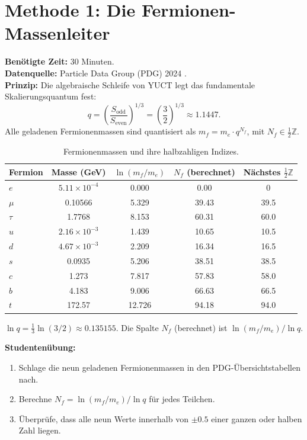 \documentclass[12pt,a4paper]{article}
\newcommand{\Sodd}{S_{\mathrm{odd}}}
\newcommand{\Seven}{S_{\mathrm{even}}}
\begin{document}
	\section{Methode 1: Die Fermionen-Massenleiter}
	\label{sec:massladder}
	
	\textbf{Benötigte Zeit:} 30 Minuten.\\
	\textbf{Datenquelle:} Particle Data Group (PDG) 2024 \cite{PDG2024}.\\
	\textbf{Prinzip:} Die algebraische Schleife von YUCT legt das fundamentale
	Skalierungsquantum fest:
	\[
	q = \left( \frac{\Sodd}{\Seven} \right)^{1/3} = \left( \frac{3}{2} \right)^{1/3} \approx 1.1447.
	\]
	Alle geladenen Fermionenmassen sind quantisiert als \(m_f = m_e \cdot q^{N_f}\),
	mit \(N_f \in \frac{1}{2}\mathbb{Z}\).
	
	\begin{table}[H]
		\centering
		\caption{Fermionenmassen und ihre halbzahligen Indizes.}
		\label{tab:fermions}
		\begin{tabular}{l c c c c}
			\toprule
			Fermion & Masse (GeV) & \(\ln(m_f/m_e)\) & \(N_f\) (berechnet) & Nächstes \(\frac{1}{2}\mathbb{Z}\) \\
			\midrule
			\(e\)   & \(5.11\times10^{-4}\) & 0.000  & 0.00  & 0 \\
			\(\mu\)  & 0.10566 & 5.329  & 39.43 & 39.5 \\
			\(\tau\) & 1.7768  & 8.153  & 60.31 & 60.0 \\
			\(u\)   & \(2.16\times10^{-3}\) & 1.439  & 10.65 & 10.5 \\
			\(d\)   & \(4.67\times10^{-3}\) & 2.209  & 16.34 & 16.5 \\
			\(s\)   & 0.0935  & 5.206  & 38.51 & 38.5 \\
			\(c\)   & 1.273   & 7.817  & 57.83 & 58.0 \\
			\(b\)   & 4.183   & 9.006  & 66.63 & 66.5 \\
			\(t\)   & 172.57  & 12.726 & 94.18 & 94.0 \\
			\bottomrule
		\end{tabular}
		\par\smallskip
		\footnotesize
		\(\ln q = \frac{1}{3}\ln(3/2) \approx 0.135155\). Die Spalte
		\(N_f\) (berechnet) ist \(\ln(m_f/m_e)/\ln q\).
	\end{table}
	
	\textbf{Studentenübung:}
	\begin{enumerate}[label=(\arabic*)]
		\item Schlage die neun geladenen Fermionenmassen in den PDG-Übersichtstabellen nach.
		\item Berechne \(N_f = \ln(m_f / m_e) / \ln q\) für jedes Teilchen.
		\item Überprüfe, dass alle neun Werte innerhalb von \(\pm 0.5\) einer ganzen oder halben Zahl liegen.
	\end{enumerate}
	
\end{document}
